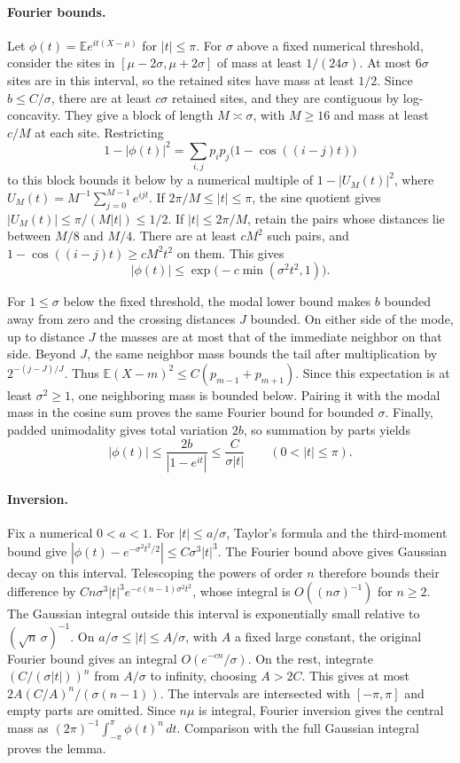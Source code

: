 \paragraph{Fourier bounds.}
Let $\phi(t)=\mathbb E e^{it(X-\mu)}$ for $|t|\le\pi$. For $\sigma$
above a fixed numerical threshold, consider the sites in
$[\mu-2\sigma,\mu+2\sigma]$ of mass at least $1/(24\sigma)$.
At most $6\sigma$ sites are in this interval, so the retained sites
have mass at least $1/2$. Since $b\le C/\sigma$, there are at least
$c\sigma$ retained sites, and they are contiguous by log-concavity.
They give a block of length $M\asymp\sigma$, with $M\ge16$ and mass
at least $c/M$ at each site. Restricting
\[
1-|\phi(t)|^2=\sum_{i,j}p_ip_j\bigl(1-\cos((i-j)t)\bigr)
\]
to this block bounds it below by a numerical multiple of
$1-|U_M(t)|^2$, where $U_M(t)=M^{-1}\sum_{j=0}^{M-1}e^{ijt}$.
If $2\pi/M\le|t|\le\pi$, the sine quotient gives
$|U_M(t)|\le\pi/(M|t|)\le1/2$. If $|t|\le2\pi/M$, retain the pairs
whose distances lie between $M/8$ and $M/4$. There are at least
$cM^2$ such pairs, and $1-\cos((i-j)t)\ge cM^2t^2$ on them. This
gives
\[
|\phi(t)|\le \exp\bigl(-c\min(\sigma^2t^2,1)\bigr).
\]

For $1\le\sigma$ below the fixed threshold, the modal lower bound
makes $b$ bounded away from zero and the crossing distances $J$
bounded. On either side of the mode, up to distance $J$ the masses
are at most that of the immediate neighbor on that side. Beyond
$J$, the same neighbor mass bounds the tail after multiplication
by $2^{-(j-J)/J}$. Thus $\mathbb E(X-m)^2\le C(p_{m-1}+p_{m+1})$.
Since this expectation is at least $\sigma^2\ge1$, one neighboring
mass is bounded below. Pairing it with the modal mass in the
cosine sum proves the same Fourier bound for bounded $\sigma$.
Finally, padded unimodality gives total variation $2b$, so summation
by parts yields
\[
|\phi(t)|\le \frac{2b}{|1-e^{it}|}\le\frac{C}{\sigma|t|}
\qquad(0<|t|\le\pi).
\]

\paragraph{Inversion.}
Fix a numerical $0<a<1$. For $|t|\le a/\sigma$, Taylor's formula
and the third-moment bound give
$|\phi(t)-e^{-\sigma^2t^2/2}|\le C\sigma^3|t|^3$.
The Fourier bound above gives Gaussian decay on this interval.
Telescoping the powers of order $n$ therefore bounds their difference
by $C n\sigma^3|t|^3 e^{-c(n-1)\sigma^2t^2}$, whose integral is
$O((n\sigma)^{-1})$ for $n\ge2$.
The Gaussian integral outside this interval is exponentially small
relative to $(\sqrt n\,\sigma)^{-1}$. On
$a/\sigma\le |t|\le A/\sigma$, with $A$ a fixed large constant,
the original Fourier bound gives an integral $O(e^{-cn}/\sigma)$.
On the rest, integrate $(C/(\sigma |t|))^n$ from $A/\sigma$ to
infinity, choosing $A>2C$. This gives at most
$2A(C/A)^n/(\sigma(n-1))$. The intervals are intersected with
$[-\pi,\pi]$ and empty parts are omitted.
Since $n\mu$ is integral, Fourier inversion gives the central mass
as $(2\pi)^{-1}\int_{-\pi}^{\pi}\phi(t)^n\,dt$. Comparison with
the full Gaussian integral proves the lemma.

